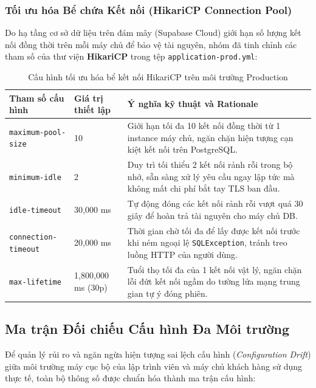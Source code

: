 \subsubsection{Tối ưu hóa Bể chứa Kết nối (HikariCP Connection Pool)}

Do hạ tầng cơ sở dữ liệu trên đám mây (Supabase Cloud) giới hạn số lượng kết nối đồng thời trên mỗi máy chủ để bảo vệ tài nguyên, nhóm đã tinh chỉnh các tham số của thư viện \textbf{HikariCP} trong tệp \texttt{application-prod.yml}:

\begin{table}[H]
\centering
\caption{Cấu hình tối ưu hóa bể kết nối HikariCP trên môi trường Production}
\label{tab:hikaricp-config}
\renewcommand{\arraystretch}{1.3}
\begin{tabular}{|p{4.5cm}|p{3cm}|p{7cm}|}
\hline
\textbf{Tham số cấu hình} & \textbf{Giá trị thiết lập} & \textbf{Ý nghĩa kỹ thuật và Rationale} \\
\hline
\texttt{maximum-pool-size} & 10 & Giới hạn tối đa 10 kết nối đồng thời từ 1 instance máy chủ, ngăn chặn hiện tượng cạn kiệt kết nối trên PostgreSQL. \\
\hline
\texttt{minimum-idle} & 2 & Duy trì tối thiểu 2 kết nối rảnh rỗi trong bộ nhớ, sẵn sàng xử lý yêu cầu ngay lập tức mà không mất chi phí bắt tay TLS ban đầu. \\
\hline
\texttt{idle-timeout} & 30,000 ms & Tự động đóng các kết nối rảnh rỗi vượt quá 30 giây để hoàn trả tài nguyên cho máy chủ DB. \\
\hline
\texttt{connection-timeout} & 20,000 ms & Thời gian chờ tối đa để lấy được kết nối trước khi ném ngoại lệ \texttt{SQLException}, tránh treo luồng HTTP của người dùng. \\
\hline
\texttt{max-lifetime} & 1,800,000 ms (30p) & Tuổi thọ tối đa của 1 kết nối vật lý, ngăn chặn lỗi đứt kết nối ngầm do tường lửa mạng trung gian tự ý đóng phiên. \\
\hline
\end{tabular}
\end{table}

\subsection{Ma trận Đối chiếu Cấu hình Đa Môi trường}

Để quản lý rủi ro và ngăn ngừa hiện tượng sai lệch cấu hình (\textit{Configuration Drift}) giữa môi trường máy cục bộ của lập trình viên và máy chủ khách hàng sử dụng thực tế, toàn bộ thông số được chuẩn hóa thành ma trận cấu hình:

